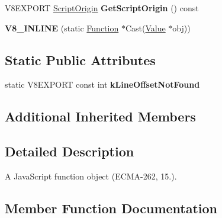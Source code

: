 \begin{DoxyCompactItemize}
\item 
\hypertarget{classv8_1_1_function_a9dfe892a6af9d2799abe3e24e726c0b1}{}V8\+E\+X\+P\+O\+R\+T \hyperlink{classv8_1_1_script_origin}{Script\+Origin} {\bfseries Get\+Script\+Origin} () const \label{classv8_1_1_function_a9dfe892a6af9d2799abe3e24e726c0b1}

\item 
\hypertarget{classv8_1_1_function_a3e01ceeeffac9e97502fa12e38f89536}{}{\bfseries V8\+\_\+\+I\+N\+L\+I\+N\+E} (static \hyperlink{classv8_1_1_function}{Function} $\ast$Cast(\hyperlink{classv8_1_1_value}{Value} $\ast$obj))\label{classv8_1_1_function_a3e01ceeeffac9e97502fa12e38f89536}

\end{DoxyCompactItemize}
\subsection*{Static Public Attributes}
\begin{DoxyCompactItemize}
\item 
\hypertarget{classv8_1_1_function_ae8687c89a18c0811d799becfba666406}{}static V8\+E\+X\+P\+O\+R\+T const int {\bfseries k\+Line\+Offset\+Not\+Found}\label{classv8_1_1_function_ae8687c89a18c0811d799becfba666406}

\end{DoxyCompactItemize}
\subsection*{Additional Inherited Members}


\subsection{Detailed Description}
A Java\+Script function object (E\+C\+M\+A-\/262, 15.). 

\subsection{Member Function Documentation}
\hypertarget{classv8_1_1_function_a2eff94c159ec39792bf3ec52c81e045c}{}
